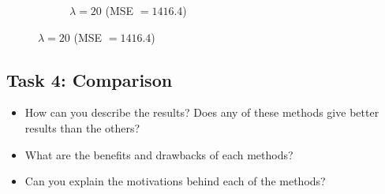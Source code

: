 \documentclass[paper=a4, fontsize=11pt]{scrartcl} %
\numberwithin{equation}{section} %
\numberwithin{figure}{section} %
\numberwithin{table}{section} %
\begin{document}
\begin{figure}[H]
\begin{subfigure}[b]{0.3\textwidth}
		\noindent{}
	\caption{$\lambda = 20$ (MSE $= 1416.4$)}
	\end{subfigure}
\end{figure}






\subsection{Task 4: Comparison}

\begin{itemize}
	\item How can you describe the results? Does any of these methods give better results than the others? 
	\item What are the benefits and drawbacks of each methods?
	\item Can you explain the motivations behind each of the methods? 
\end{itemize}



 

\end{document}
